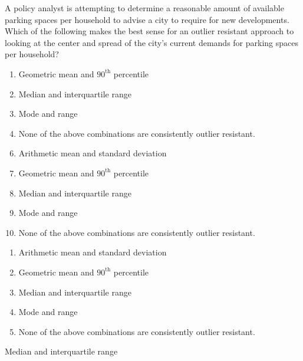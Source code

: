  
A policy analyst is attempting to determine a reasonable amount of available parking spaces per household to advise a city to require for new developments.  Which of the following makes the best sense for an outlier resistant approach to looking at the center and spread of the city's current demands for parking spaces per household?


\ifsat
	\begin{enumerate}[label=\Alph*)]
		\item Geometric mean and $90^{\mathrm{th}}$ percentile
		\item Median and interquartile range %
		\item Mode and range
		\item None of the above combinations are consistently outlier resistant.
	\end{enumerate}
\else
\fi

\ifacteven
	\begin{enumerate}[label=\textbf{\Alph*.},itemsep=\fill,align=left]
		\setcounter{enumii}{5}
		\item Arithmetic mean and standard deviation
		\item Geometric mean and $90^{\mathrm{th}}$ percentile
		\item Median and interquartile range %
		\addtocounter{enumii}{1}
		\item Mode and range
		\item None of the above combinations are consistently outlier resistant.
	\end{enumerate}
\else
\fi

\ifactodd
	\begin{enumerate}[label=\textbf{\Alph*.},itemsep=\fill,align=left]
		\item Arithmetic mean and standard deviation
		\item Geometric mean and $90^{\mathrm{th}}$ percentile
		\item Median and interquartile range %
		\item Mode and range
		\item None of the above combinations are consistently outlier resistant.
	\end{enumerate}
\else
\fi

\ifgridin
 Median and interquartile range %
		
\else
\fi

